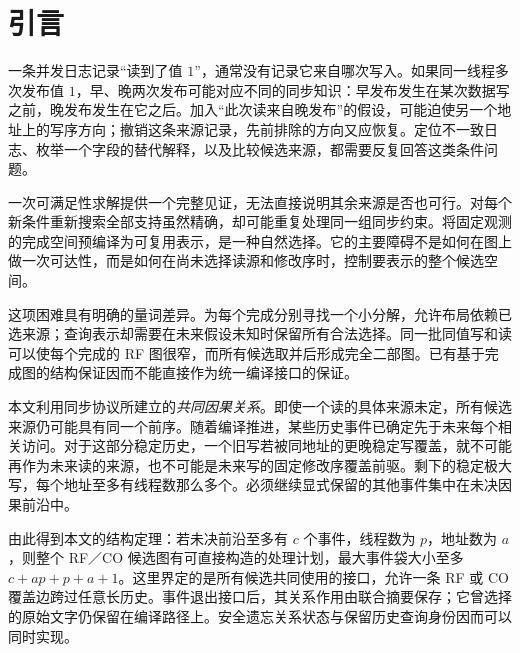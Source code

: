 \begin{abstract}
不完整的来源观测会留下多个读自关系与修改序补全，分析任务因而需要回答条件下哪些来源和写序仍然可行，而不仅是寻找一个见证。困难在于：每个完成的执行图具有小接口，并不保证所有候选的共同表示也具有小接口。本文研究固定事件的 Release--Acquire 观测，提出由协议共同因果关系定义的未决前沿。对于前沿以外已经确定先于未来相关访问的历史，每个地址只需保留少量极大写；结合线程尾事件，可构造覆盖全部 RF／CO 候选的连续处理计划。我们从单生产者／单消费者缓冲的容量反馈及重置／唤醒屏障推导统一证书，并证明精确编译对全部原始赋值保持投影，使已退休事件的来源身份仍可用于条件支持与假设撤销。实验中，容量为三的分支缓冲从四轮增至三十二轮时，最大可达层状态保持为三十；容量增至六则触及当前状态预算。组件分解和日志快照频率又会改变编译与 SAT 的收益关系。这些结果说明，协议结构能够支持可复用的精确分析，同时给出其计算收益的具体适用条件。
\end{abstract}

\section{引言}
一条并发日志记录“读到了值 $1$”，通常没有记录它来自哪次写入。如果同一线程多次发布值 $1$，早、晚两次发布可能对应不同的同步知识：早发布发生在某次数据写之前，晚发布发生在它之后。加入“此次读来自晚发布”的假设，可能迫使另一个地址上的写序方向；撤销这条来源记录，先前排除的方向又应恢复。定位不一致日志、枚举一个字段的替代解释，以及比较候选来源，都需要反复回答这类条件问题。

一次可满足性求解提供一个完整见证，无法直接说明其余来源是否也可行。对每个新条件重新搜索全部支持虽然精确，却可能重复处理同一组同步约束。将固定观测的完成空间预编译为可复用表示，是一种自然选择。它的主要障碍不是如何在图上做一次可达性，而是如何在尚未选择读源和修改序时，控制要表示的整个候选空间。

这项困难具有明确的量词差异。为每个完成分别寻找一个小分解，允许布局依赖已选来源；查询表示却需要在未来假设未知时保留所有合法选择。同一批同值写和读可以使每个完成的 RF 图很窄，而所有候选取并后形成完全二部图。已有基于完成图的结构保证因而不能直接作为统一编译接口的保证。

本文利用同步协议所建立的\emph{共同因果关系}。即使一个读的具体来源未定，所有候选来源仍可能具有同一个前序。随着编译推进，某些历史事件已确定先于未来每个相关访问。对于这部分稳定历史，一个旧写若被同地址的更晚稳定写覆盖，就不可能再作为未来读的来源，也不可能是未来写的固定修改序覆盖前驱。剩下的稳定极大写，每个地址至多有线程数那么多个。必须继续显式保留的其他事件集中在未决因果前沿中。

由此得到本文的结构定理：若未决前沿至多有 $c$ 个事件，线程数为 $p$，地址数为 $a$，则整个 RF／CO 候选图有可直接构造的处理计划，最大事件袋大小至多 $c+ap+p+a+1$。这里界定的是所有候选共同使用的接口，允许一条 RF 或 CO 覆盖边跨过任意长历史。事件退出接口后，其关系作用由联合摘要保存；它曾选择的原始文字仍保留在编译路径上。安全遗忘关系状态与保留历史查询身份因而可以同时实现。

